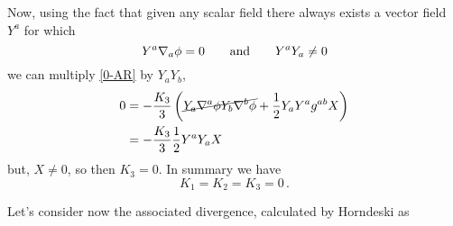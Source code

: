 Now, using the fact that given any scalar field there always exists a vector field $Y^{a}$ for which \cite{Horndeski:1974wa}
\begin{equation}
  Y^{a}\nabla_a\phi =0\qquad \text{and}\qquad Y^{a}Y_a\neq 0
\end{equation}
we can multiply \eqref{0-AR} by $Y_aY_b$,
\begin{align}
  0&=-\frac{K_3}{3}\left(\cancel{Y_a\nabla^{a}\phi Y_b\nabla^b\phi} +\frac{1}{2}Y_aY^{a}g^{ab}X\right) \\
  &=-\frac{K_3}{3}\frac{1}{2}Y^{a}Y_a X
\end{align}
but, $X\neq 0$, so then $K_3=0$. In summary we have
\begin{equation}\label{K1230}
  K_1=K_2=K_3=0\,.
\end{equation}

Let's consider now the associated divergence, calculated by Horndeski as \cite{Horndeski:1974wa}
